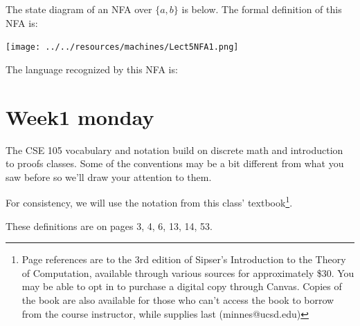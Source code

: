 \documentclass[12pt, oneside]{article}
\begin{document}
\newpage

The state diagram of an NFA over $\{a,b\}$ is below.  The formal definition of this NFA is:

\vspace{-30pt}

\texttt{[image: ../../resources/machines/Lect5NFA1.png]}


\vspace{-10pt}

The language recognized by this NFA is:  \vfill
\section*{Week1 monday}


The CSE 105 vocabulary and notation build on discrete
math and introduction to proofs classes.  Some of the conventions may 
be a bit different from what you saw before so we'll draw your attention to them.

For consistency, we will use the notation from this class' textbook\footnote{Page references are to 
the 3rd edition of Sipser's Introduction to the Theory of Computation,
available through various sources for approximately \$30. You may be able to 
opt in to purchase a digital copy through Canvas. Copies of the book are also available 
for those who can't access the book
to borrow from the course instructor, while supplies last (minnes@ucsd.edu)}.

These definitions are on pages 3, 4, 6, 13, 14, 53.
\end{document}
